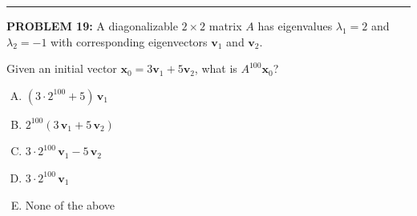 \documentclass[12pt]{amsart}
\newcommand{\divider}{
  \vspace{-1em} %
  \noindent
  \raisebox{-0.15ex}{\textbullet}%
  \hspace{0.5em}%
  \rule[0.5ex]{0.95\textwidth}{1.0pt}%
  \hspace{0.5em}%
  \raisebox{-0.15ex}{\textbullet}%
  \vspace{0em} %
}
\begin{document}

\divider

{\bf PROBLEM 19:}
%
A diagonalizable $2 \times 2$ matrix $A$ has eigenvalues $\lambda_1 = 2$ 
and $\lambda_2 = -1$ with corresponding eigenvectors $\mathbf{v}_1$ 
and $\mathbf{v}_2$.

Given an initial vector $\mathbf{x}_0 = 3\mathbf{v}_1 + 5\mathbf{v}_2$, 
what is $A^{100}\mathbf{x}_0$?

\begin{enumerate}[(A)]
\item $(3 \cdot 2^{100} + 5)\,\mathbf{v}_1$
\item $2^{100}(3\,\mathbf{v}_1 + 5\,\mathbf{v}_2)$
\item $3 \cdot 2^{100}\,\mathbf{v}_1 - 5\,\mathbf{v}_2$
\item $3 \cdot 2^{100}\,\mathbf{v}_1$
\item None of the above
\end{enumerate}
\end{document}
